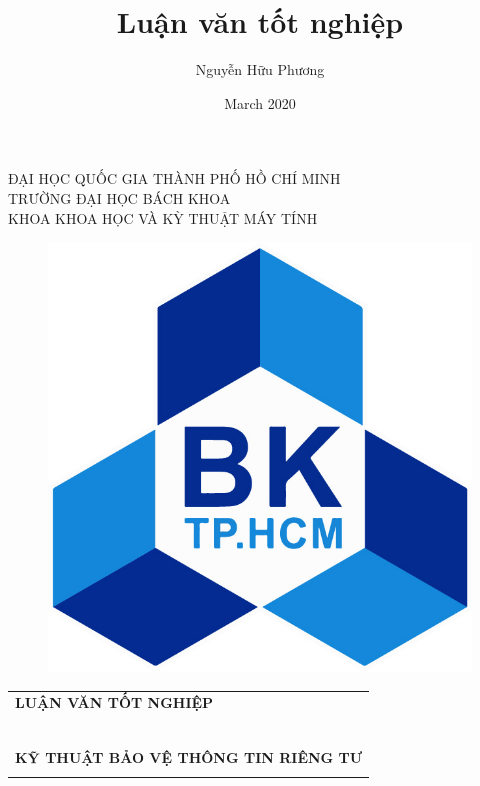 \documentclass[11pt,a4paper]{article}
\title{Luận văn tốt nghiệp}
\author{Nguyễn Hữu Phương}
\date{March 2020}
\begin{document}
\begin{titlepage}
\begin{center}
    ĐẠI HỌC QUỐC GIA THÀNH PHỐ HỒ CHÍ MINH\\
    TRƯỜNG ĐẠI HỌC BÁCH KHOA\\
    KHOA KHOA HỌC VÀ KỲ THUẬT MÁY TÍNH
\end{center}

\vspace{1cm}

\begin{figure}[h!]
    \centering
    \includegraphics[scale = 0.2]{fig/hcmut.jpg}
\end{figure}

\vspace{1cm}

\begin{center}
\begin{tabular}{c}
    \multicolumn{1}{l}{\textbf{{\Large LUẬN VĂN TỐT NGHIỆP}}}\\
    ~~\\
    \hline
    \\
    \multicolumn{1}{l}{\textbf{{\Large KỸ THUẬT BẢO VỆ THÔNG TIN RIÊNG TƯ}}}\\
    \\


\end{tabular}
\end{center}
\end{titlepage}
\end{document}

